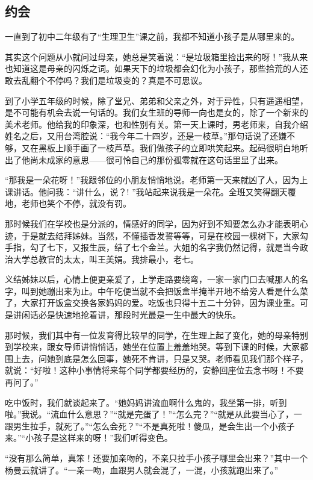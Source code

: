 \subsection{约会}

\par 一直到了初中二年级有了“生理卫生”课之前，我都不知道小孩子是从哪里来的。
\par 其实这个问题从小就问过母亲，她总是笑着说：“是垃圾箱里捡出来的呀！”我从来也知道这是母亲的闪烁之词。如果天下的垃圾都会幻化为小孩子，那些拾荒的人还敢去乱翻个不停吗？我们是垃圾变的？真是不可思议。
\par 到了小学五年级的时候，除了堂兄、弟弟和父亲之外，对于异性，只有遥遥相望，是不可能有机会去说一句话的。我们女生班的导师一向也是女的，除了一个新来的美术老师。他给我的印象深，也和性别有关。第一天上课时，男老师来，自我介绍姓名之后，又用台湾腔说：“我今年二十四岁，还是一枝草。”那句话说了还嫌不够，又在黑板上顺手画了一枝芦草。我们做孩子的立即哄笑起来。起码很明白地听出了他尚未成家的意思——很可怜自己的那份孤零就在这句话里显了出来。
\par “那我是一朵花呀！”我跟邻位的小朋友悄悄地说。老师第一天来就凶了人，因为上课讲话。他问我：“讲什么，说？! ”我站起来说我是一朵花。全班又笑得翻天覆地，老师也笑个不停，就没有罚。
\par 那时候我们在学校也是分派的，情感好的同学，因为好到不知要怎么办才能表明心迹，于是就去结拜姊妹。当然，不懂插香发誓等等，可是在校园一棵树下，大家勾手指，勾了七下，又报生辰，结了七个金兰。大姐的名字我仍然记得，就是当今政治大学总教官的太太，叫王美娟。我排最小，老七。
\par 义结姊妹以后，心情上便更亲爱了，上学走路要绕弯，一家一家门口去喊那人的名字，叫到她蹦出来为止。中午吃便当就不会把饭盒半掩半开地不给旁人看是什么菜了，大家打开饭盒交换各家妈妈的爱。吃饭也只得十五二十分钟，因为课业重。可是讲闲话必是快速地抢着讲，那段时光最是一生中最大的快乐。
\par 那时候，我们其中有一位发育得比较早的同学，在生理上起了变化，她的母亲特别到学校来，跟女导师讲悄悄话，她坐在位置上羞羞地哭。等到下课的时候，大家都围上去，问她到底是怎么回事，她死不肯讲，只是又哭。老师看见我们那个样子，就说：“好啦！这种小事情将来每个同学都要经历的，安静回座位去念书呀！不要再问了。”
\par 吃中饭时，我们就谈起来了。“她妈妈讲流血啊什么鬼的，我坐第一排，听到啦。”我说。“流血什么意思？”“就是完蛋了！”“怎么完？”“就是从此要当心了，一跟男生拉手，就死了。”“怎么会死？”“不是真死啦！傻瓜，是会生出一个小孩子来。”“小孩子是这样来的呀！”我们听得变色。
\par “没有那么简单，真笨！还要加亲吻的，不亲只拉手小孩子哪里会出来？”其中一个杨曼云就讲了。“一亲一吻，血跟男人就会混了，一混，小孩就跑出来了。”

